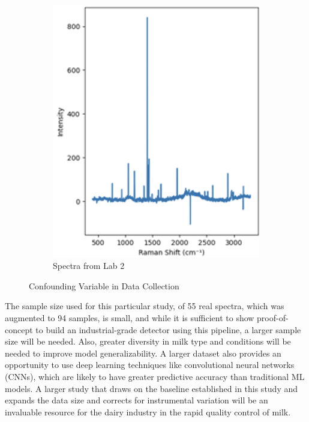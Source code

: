 \begin{figure}[htbp]
\begin{subfigure}[b]{0.45\textwidth}
    \includegraphics[width=\textwidth]{Figures/Sampath.png}
    \caption{Spectra from Lab 2}
    \label{fig:sampath}
  \end{subfigure}
  \caption{Confounding Variable in Data Collection}
  \label{fig:combined3}
\end{figure}

\noindent The sample size used for this particular study, of 55 real spectra, which was augmented to 94 samples, is small, and while it is sufficient to show proof-of-concept to build an industrial-grade detector using this pipeline, a larger sample size will be needed. Also, greater diversity in milk type and conditions will be needed to improve model generalizability. A larger dataset also provides an opportunity to use deep learning techniques like convolutional neural networks (CNNs), which are likely to have greater predictive accuracy than traditional ML models. A larger study that draws on the baseline established in this study and expands the data size and corrects for instrumental variation will be an invaluable resource for the dairy industry in the rapid quality control of milk. 

